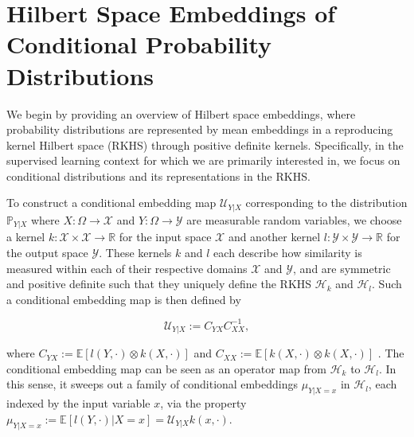 \documentclass{article}
\begin{document}
%
	
\section{Hilbert Space Embeddings of Conditional Probability Distributions}
\label{sec:background}

	We begin by providing an overview of Hilbert space embeddings, where probability distributions are represented by mean embeddings in a reproducing kernel Hilbert space (RKHS) through positive definite kernels. Specifically, in the supervised learning context for which we are primarily interested in, we focus on conditional distributions and its representations in the RKHS.
	
	To construct a conditional embedding map $\mathcal{U}_{Y | X}$ corresponding to the distribution $\mathbb{P}_{Y | X}$ where $X : \Omega \to \mathcal{X}$ and $Y: \Omega \to \mathcal{Y}$ are measurable random variables, we choose a kernel $k : \mathcal{X} \times \mathcal{X} \to \mathbb{R}$ for the input space $\mathcal{X}$ and another kernel $l : \mathcal{Y} \times \mathcal{Y} \to \mathbb{R}$ for the output space $\mathcal{Y}$. These kernels $k$ and $l$ each describe how similarity is measured within each of their respective domains $\mathcal{X}$ and $\mathcal{Y}$, and are symmetric and positive definite such that they uniquely define the RKHS $\mathcal{H}_{k}$ and $\mathcal{H}_{l}$. Such a conditional embedding map is then defined by
	
	\begin{equation}
		\mathcal{U}_{Y | X} := C_{YX} C_{XX}^{-1},
	\label{eq:conditional_embedding}
	\end{equation}
	
	where $C_{YX} := \mathbb{E}[l(Y, \cdot) \otimes k(X, \cdot)]$ and $C_{XX} := \mathbb{E}[k(X, \cdot) \otimes k(X, \cdot)]$ \citep{song2009hilbert}. The conditional embedding map can be seen as an operator map from $\mathcal{H}_{k}$ to $\mathcal{H}_{l}$. In this sense, it sweeps out a family of conditional embeddings $\mu_{Y | X = x}$ in $\mathcal{H}_{l}$, each indexed by the input variable $x$, via the property $\mu_{Y | X = x} := \mathbb{E}[l(Y, \cdot) | X = x] = \mathcal{U}_{Y | X} k(x, \cdot)$.
	
\end{document}
